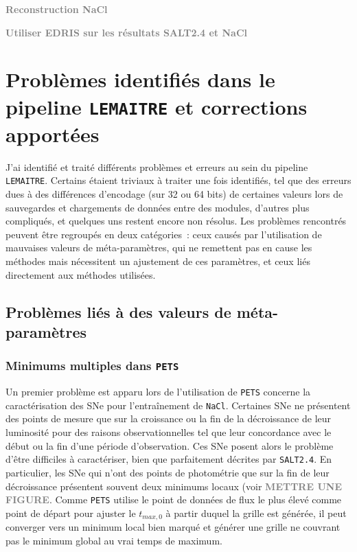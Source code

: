 \documentclass{book}
\newcommand{\todo}[1]{{\textcolor{gray}{\bf \large #1}}}
\def\lemaitre{\texttt{LEMAITRE}\xspace}
\def\pets{\texttt{PETS}\xspace}
\def\nacl{\texttt{NaCl}\xspace}
\def\saltd{\texttt{SALT2.4}\xspace}
\begin{document}

\todo{Reconstruction NaCl}

\todo{Utiliser EDRIS sur les résultats SALT2.4 et NaCl}


\section{Problèmes identifiés dans le pipeline \lemaitre et corrections apportées}

J'ai identifié et traité différents problèmes et erreurs au sein du pipeline \lemaitre. Certains étaient triviaux à traiter une fois identifiés, tel que des erreurs dues à des différences d'encodage (sur 32 ou 64 bits) de certaines valeurs lors de sauvegardes et chargements de données entre des modules, d'autres plus compliqués, et quelques uns restent encore non résolus. Les problèmes rencontrés peuvent être regroupés en deux catégories~: ceux causés par l'utilisation de mauvaises valeurs de méta-paramètres, qui ne remettent pas en cause les méthodes mais nécessitent un ajustement de ces paramètres, et ceux liés directement aux méthodes utilisées.

\subsection{Problèmes liés à des valeurs de méta-paramètres}

\subsubsection{Minimums multiples dans \pets}

Un premier problème est apparu lors de l'utilisation de \pets concerne la caractérisation des SNe pour l'entraînement de \nacl. Certaines SNe ne présentent des points de mesure que sur la croissance ou la fin de la décroissance de leur luminosité pour des raisons observationnelles tel que leur concordance avec le début ou la fin d'une période d'observation. Ces SNe posent alors le problème d'être difficiles à caractériser, bien que parfaitement décrites par \saltd. En particulier, les SNe qui n'ont des points de photométrie que sur la fin de leur décroissance présentent souvent deux minimums locaux (voir \todo{METTRE UNE FIGURE}. Comme \pets utilise le point de données de flux le plus élevé comme point de départ pour ajuster le $t_{max, 0}$ à partir duquel la grille est générée, il peut converger vers un minimum local bien marqué et générer une grille ne couvrant pas le minimum global au vrai temps de maximum.
\end{document}

